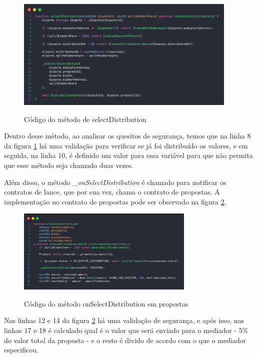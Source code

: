\begin{figure}[!h]
  \centering
  \caption{Código do método de selectDistribution}
  \includegraphics[width=400px]{src/images/contracts/select_distribution_dispute.png}
  \label{fig:select_distribution_dispute_fig}
\end{figure}

Dentro desse método, ao analisar os quesitos de segurança, temos que na linha 8 da figura \ref{fig:select_distribution_dispute_fig} há uma validação para verificar se já foi distribuído os valores, e em seguida, na linha 10, é definido um valor para essa variável para que não permita que esse método seja chamado duas vezes.

Além disso, o método \textit{\_onSelectDistribution} é chamado para notificar os contratos de lance, que por sua vez, chama o contrato de propostas. A implementação no contrato de propostas pode ser observado na figura \ref{fig:on_select_distribution_proposal_fig}.

\begin{figure}[!h]
  \centering
  \caption{Código do método onSelectDistribution em propostas}
  \includegraphics[width=320px]{src/images/contracts/on_select_distribution_proposal.png}
  \label{fig:on_select_distribution_proposal_fig}
\end{figure}

Nas linhas 12 e 14 da figura \ref{fig:on_select_distribution_proposal_fig} há uma validação de segurança, e após isso, nas linhas 17 e 18 é calculado qual é o valor que será enviado para o mediador - 5\% do valor total da proposta - e o resto é divido de acordo com o que o mediador especificou. 

